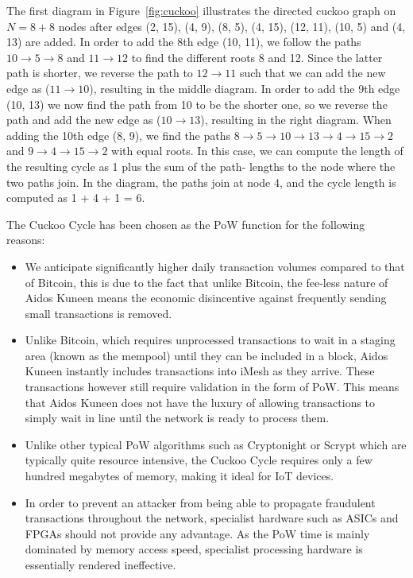 \documentclass[a4paper,10pt,twocolumn]{article}
\begin{document}
The first diagram in Figure~\ref{fig:cuckoo} illustrates the directed cuckoo graph on \( N = 8 + 8 \) nodes after edges (2, 15), (4, 
9), (8, 5), (4, 15), (12, 11), (10, 5) and (4, 13) are added. In order to add the 8th edge (10, 11), we follow the paths \( 10 
\rightarrow 5 \rightarrow 8 \) and \( 11 \rightarrow 12 \) to find the different roots 8 and 12. Since the latter path is shorter, we 
reverse the path to \( 12 \rightarrow 11\) such that we can add the new edge as (\( 11 \rightarrow 10\)), resulting in the middle 
diagram. In order to add the 9th edge (10, 13) we now find the path from 10 to be the shorter one, so we reverse the path and add the 
new edge as (\( 10 \rightarrow 13\)), resulting in the right diagram. When adding the 10th edge (8, 9), we find the paths
 \( 8 \rightarrow 5 \rightarrow 10 \rightarrow 13 \rightarrow 4  \rightarrow 15 \rightarrow 2 \) and \( 9 \rightarrow 4 \rightarrow 15 
 \rightarrow 2 \)  with equal roots. In this case, we can compute the length of the resulting cycle as 1 plus the sum of the path-
 lengths to the node where the two paths join. In the diagram, the paths join at node 4, and the cycle length is computed as 1 + 4 + 1 
 = 6.

The Cuckoo Cycle has been chosen as the PoW function for the following reasons:

\begin{itemize}
\item We anticipate significantly higher daily transaction volumes compared to that of Bitcoin, this is due to the fact that unlike Bitcoin, the fee-less nature of Aidos Kuneen means the economic disincentive against frequently sending small transactions is removed. 

\item Unlike Bitcoin, which requires unprocessed transactions to wait in a staging area (known as the mempool) until they can be included in a block, Aidos Kuneen instantly includes transactions into iMesh as they arrive. These transactions however still require validation in the form of PoW. This means that Aidos Kuneen does not have the luxury of allowing transactions to simply wait in line until the network is ready to process them.

\item Unlike other typical PoW algorithms such as Cryptonight or Scrypt which are typically quite resource intensive, the Cuckoo Cycle requires only a few hundred megabytes of memory, making it ideal for IoT devices.

\item In order to prevent an attacker from being able to propagate fraudulent transactions throughout the network, specialist hardware such as ASICs and FPGAs should not provide any advantage. As the PoW time is mainly dominated by memory access speed, specialist processing hardware is essentially rendered ineffective.
\end{itemize}
\end{document}
